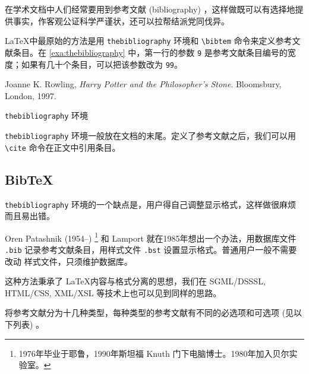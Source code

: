 在学术文档中人们经常要用到参考文献 (bibliography) ，这样做既可以有选择地提供事实，作客观公证科学严谨状，还可以拉帮结派党同伐异。

\LaTeX 中最原始的方法是用 
\texttt{thebibliography} 环境和 \verb|\bibtem| 命令来定义参考文献条目。在 \autoref{exa:thebibliography} 中，第一行的参数 \texttt{9} 是参考文献条目编号的宽度；如果有几十个条目，可以把该参数改为 \texttt{99}。

\begin{example}[h]
\begin{BTDemo}[]
\begin{thebibliography}{9}
    Joanne K. Rowling,
    \emph{Harry Potter and the Philosopher's Stone}.
    Bloomsbury, London,
    1997.
\end{thebibliography}
\end{BTDemo}
\caption{\texttt{thebibliography} 环境}
\label{exa:thebibliography}
\end{example}

\texttt{thebibliography} 环境一般放在文档的末尾。定义了参考文献之后，我们可以用 \verb|\cite| 命令在正文中引用条目。

\begin{RLDemo}[numbers=none]
\cite{Rowling_1997}
\end{RLDemo}

\subsection{BibTeX}

\texttt{thebibliography} 环境的一个缺点是，用户得自己调整显示格式，这样做很麻烦而且易出错。

Oren Patashnik (1954--)\indexPatashnik{} \footnote{1976年毕业于耶鲁，1990年斯坦福 Knuth 门下电脑博士。1980年加入贝尔实验室。} 和 Lamport 就在1985年想出一个办法，用数据库文件 \texttt{.bib} 记录参考文献条目，用样式文件 \texttt{.bst} 设置显示格式。普通用户一般不需要改动 样式文件，只须维护数据库。

这种方法秉承了 \LaTeX 内容与格式分离的思想，我们在 SGML/DSSSL, HTML/CSS, XML/XSL 等技术上也可以见到同样的思路。

\BibTeX 将参考文献分为十几种类型，每种类型的参考文献有不同的必选项和可选项 (见以下列表) 。

